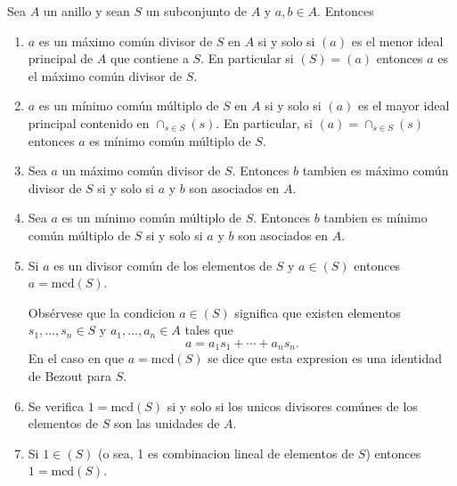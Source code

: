\begin{proposition}{}{}
Sea \(A\) un anillo y sean \(S\) un subconjunto de \(A\) y \(a, b \in A\). Entonces
\begin{enumerate}
\item \(a\) es un máximo común divisor de \(S\) en \(A\) si y solo si \((a)\) es el menor ideal principal de \(A\) que contiene a \(S\). En particular si \((S) = (a)\) entonces \(a\) es el máximo común divisor de \(S\).

\item \(a\) es un mínimo común múltiplo de \(S\) en \(A\) si y solo si \((a)\) es el mayor ideal principal contenido en \(\cap_{s \in S}(s)\). En particular, si \((a) = \cap_{s \in S}(s)\) entonces \(a\) es mínimo común múltiplo de \(S\).

\item Sea \(a\) un máximo común divisor de \(S\). Entonces \(b\) tambien es máximo común divisor de \(S\) si y solo si \(a\) y \(b\) son asociados en \(A\).

\item Sea \(a\) es un mínimo común múltiplo de \(S\). Entonces \(b\) tambien es mínimo común múltiplo de \(S\) si y solo si \(a\) y \(b\) son asociados en \(A\).

\item Si \(a\) es un divisor común de los elementos de \(S\) y \(a \in (S)\) entonces \(a = \mathrm{mcd}(S)\).

Obsérvese que la condicion \(a \in (S)\) significa que existen elementos \(s_1, \ldots, s_n \in S\) y \(a_1, \ldots, a_n \in A\) tales que
\[
a = a_1 s_1 + \cdots + a_n s_n.
\]
En el caso en que \(a = \mathrm{mcd}(S)\) se dice que esta expresion es una identidad de Bezout para \(S\).

\item Se verifica \(1 = \mathrm{mcd}(S)\) si y solo si los unicos divisores comúnes de los elementos de \(S\) son las unidades de \(A\).

\item Si \(1 \in (S)\) (o sea, 1 es combinacion lineal de elementos de \(S\)) entonces \(1 = \mathrm{mcd}(S)\).
\end{enumerate}

\end{proposition}


